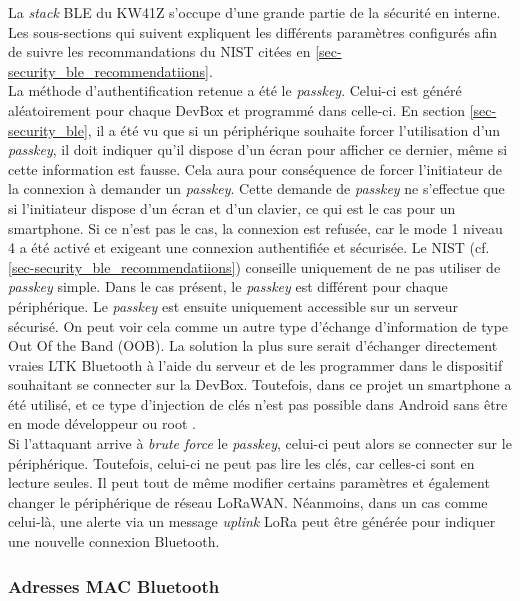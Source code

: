 La \textit{stack} BLE du KW41Z s'occupe d'une grande partie de la sécurité en interne. Les sous-sections qui suivent expliquent les différents paramètres configurés afin de suivre les recommandations du NIST citées en \cref{sec-security_ble_recommendatiions}.\\


La méthode d'authentification retenue a été le \textit{passkey}. Celui-ci est généré aléatoirement pour chaque DevBox et programmé dans celle-ci. En section \cref{sec-security_ble}, il a été vu que si un périphérique souhaite forcer l'utilisation d'un \textit{passkey}, il doit indiquer qu'il dispose d'un écran pour afficher ce dernier, même si cette information est fausse. Cela aura pour conséquence de forcer l'initiateur de la connexion à demander un \textit{passkey}. Cette demande de \textit{passkey} ne s'effectue que si l'initiateur dispose d'un écran et d'un clavier, ce qui est le cas pour un smartphone. Si ce n'est pas le cas, la connexion est refusée, car le mode 1 niveau 4 a été activé et exigeant une connexion authentifiée et sécurisée. 
Le NIST (cf. \cref{sec-security_ble_recommendatiions}) conseille uniquement de ne pas utiliser de \textit{passkey} simple. Dans le cas présent, le \textit{passkey} est différent pour chaque périphérique. Le \textit{passkey} est ensuite uniquement accessible sur un serveur sécurisé. On peut voir cela comme un autre type d'échange d'information de type Out Of the Band (OOB). La solution la plus sure serait d'échanger directement vraies LTK Bluetooth à l'aide du serveur et de les programmer dans le dispositif souhaitant se connecter sur la DevBox. Toutefois, dans ce projet un smartphone a été utilisé, et ce type d'injection de clés n'est pas possible dans Android sans être en mode développeur ou root \cite{Gettingt47:online}.\\

Si l'attaquant arrive à \textit{brute force} le \textit{passkey}, celui-ci peut alors se connecter sur le périphérique. Toutefois, celui-ci ne peut pas lire les clés, car celles-ci sont en lecture seules. Il peut tout de même modifier certains paramètres et également changer le périphérique de réseau LoRaWAN. Néanmoins, dans un cas comme celui-là, une alerte via un message \textit{uplink} LoRa peut être générée pour indiquer une nouvelle connexion Bluetooth.


\subsubsection{Adresses MAC Bluetooth}

